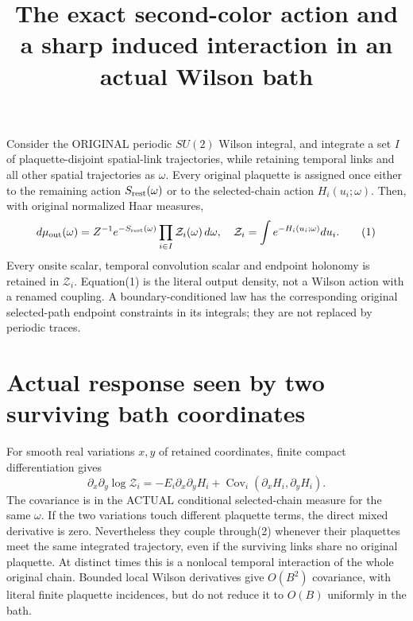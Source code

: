 \documentclass{article}
\title{The exact second-color action and a sharp induced interaction in an actual Wilson bath}\author{}\date{}
\begin{document}
\maketitle
Consider the ORIGINAL periodic $SU(2)$ Wilson integral, and integrate a set $I$ of plaquette-disjoint spatial-link trajectories, while retaining temporal links and all other spatial trajectories as $\omega$. Every original plaquette is assigned once either to the remaining action $S_{\rm rest}(\omega)$ or to the selected-chain action $H_i(u_i;\omega)$. Then, with original normalized Haar measures,
\[
 d\mu_{\rm out}(\omega)=Z^{-1}e^{-S_{\rm rest}(\omega)}
                 \prod_{i\in I}\mathcal Z_i(\omega)\,d\omega,
 \quad \mathcal Z_i=\int e^{-H_i(u_i;\omega)}du_i.       \tag{1}
\]
Every onsite scalar, temporal convolution scalar and endpoint holonomy is retained in $\mathcal Z_i$. Equation(1) is the literal output density, not a Wilson action with a renamed coupling. A boundary-conditioned law has the corresponding original selected-path endpoint constraints in its integrals; they are not replaced by periodic traces.

\section*{Actual response seen by two surviving bath coordinates}
For smooth real variations $x,y$ of retained coordinates, finite compact differentiation gives
\[
 \partial_x\partial_y\log\mathcal Z_i
 =-E_i\partial_x\partial_y H_i
   +\operatorname{Cov}_i(\partial_xH_i,\partial_yH_i).  \tag{2}
\]
The covariance is in the ACTUAL conditional selected-chain measure for the same $\omega$. If the two variations touch different plaquette terms, the direct mixed derivative is zero. Nevertheless they couple through(2) whenever their plaquettes meet the same integrated trajectory, even if the surviving links share no original plaquette. At distinct times this is a nonlocal temporal interaction of the whole original chain. Bounded local Wilson derivatives give $O(B^2)$ covariance, with literal finite plaquette incidences, but do not reduce it to $O(B)$ uniformly in the bath.
\end{document}
